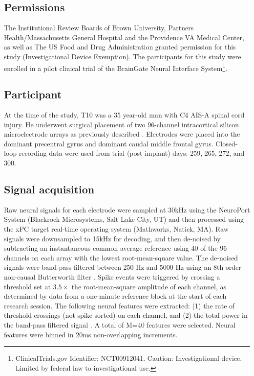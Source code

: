 \subsection{Permissions}

The Institutional Review Boards of Brown University, Partners Health/Massachusetts General Hospital and the Providence VA Medical Center, as well as The US Food and Drug Administration granted permission for this study (Investigational Device Exemption). The participants for this study were enrolled in a pilot clinical trial of the BrainGate Neural Interface System\footnote{ClinicalTrials.gov Identifier: NCT00912041. Caution: Investigational device. Limited by federal law to investigational use.}.

\subsection{Participant}

At the time of the study, T10 was a 35 year-old man with C4 AIS-A spinal cord injury. He underwent surgical placement of two 96-channel intracortical silicon microelectrode arrays \cite{Maynard1997} as previously described \cite{Simeral2011, Kim2008}. Electrodes were placed into the dominant precentral gyrus and dominant caudal middle frontal gyrus. Closed-loop recording data were used from trial (post-implant) days: 259, 265, 272, and 300. 

\subsection{Signal acquisition}

Raw neural signals for each electrode were sampled at 30kHz using the NeuroPort System (Blackrock Microsystems, Salt Lake City, UT) and then processed using the xPC target real-time operating system (Mathworks, Natick, MA). Raw signals were downsampled to 15kHz for decoding, and then de-noised by subtracting an instantaneous common average reference \cite{Jarosiewicz2015, Gilja2015} using 40 of the 96 channels on each array with the lowest root-mean-square value. The de-noised signals were band-pass filtered between 250 Hz and 5000 Hz using an 8th order non-causal Butterworth filter \cite{Masse2015}. Spike events were triggered by crossing a threshold set at $3.5\times$ the root-mean-square amplitude of each channel, as determined by data from a one-minute reference block at the start of each research session. The following neural features were extracted: (1) the rate of threshold crossings (not spike sorted) on each channel, and (2) the total power in the band-pass filtered signal \cite{Jarosiewicz2013, Jarosiewicz2015, Bacher2015, Brandman2018}.  A total of M=40 features were selected.  Neural features were binned in 20ms non-overlapping increments.

